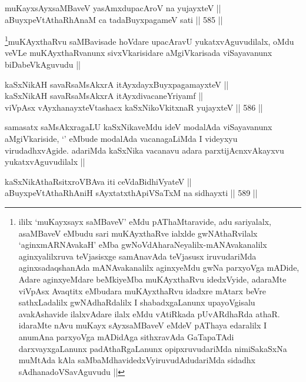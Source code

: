 \begin{shl}
muKayxsAyxsaMBaveV yasAmxdupacAroV na yujayxteV || \\
aBuyxpeVtAthaRhAnaM ca tadaBuyxpagameV sati ||  585 ||  
\end{shl}

\begin{artha}
\footnote{ililx `muKayxsayx saMBaveV' eMdu pAThaMtaravide, adu sariyalalx, asaMBaveV eMbudu sari muKAyxthaRve ialxlde gwNAthaRvilalx `aginxmARNAvakaH' eMba gwNoVdAharaNeyalilx-mANAvakanalilx aginxyalilxruva teVjasisxge samAnavAda teVjasusx iruvudariMda aginxsadaqshanAda mANAvakanalilx aginxyeMdu gwNa parxyoVga mADide, Adare aginxyeMdare beMkiyeMba muKAyxthaRvu idedxVyide, adaraMte viVpAsx Avaqtitx eMbudara muKAyxthaRvu idadxre mAtarx beVre sathxLadalilx gwNAdhaRdalilx I shabadxgaLanunx upayoVgisalu avakAshavide ilalxvAdare ilalx eMdu vAtiRkada pUvARdhaRda athaR. idaraMte nAvu muKayx sAyxsaMBaveV eMdeV pAThaya edaralilx I anumAna parxyoVga mADidAga sithxravAda GaTapaTAdi darxvayxgaLanunx padAthaRgaLanunx opipxruvudariMda nimiSakaSxNa muMtAda kAla saMbaMdhavidedxVyiruvudAdudariMda sidadhx sAdhanadoVSavAguvudu ||}muKAyxthaRvu saMBavisade hoVdare upacAravU yukatxvAguvudilalx, oMdu veVLe muKAyxthaRvanunx sivxVkarisidare aMgiVkarisada viSayavanunx biDabeVkAguvudu ||
\end{artha}


\begin{shl}
kaSxNikAH  savaRsaMsAkxrA itAyxdayxBuyxpagamayxteV || \\
kaSxNikAH  savaRsaMsAkxrA itAyxdivacaneYriyamf || \\
viVpAsx vAyxhanayxteV\s tashacx kaSxNikoVkitxnaR yujayxteV ||  586 ||  
\end{shl}

\begin{artha}
samasatx saMsAkxragaLU kaSxNikaveMdu ideV modalAda viSayavanunx aMgiVkariside, `\stext' eMbude modalAda vacanagaLiMda I videyxyu virudadhxvAgide. adariMda kaSxNika vacanavu adara parxtijAcnxvAkayxvu yukatxvAguvudilalx ||
\end{artha}


\begin{shl}
kaSxNikAthaRsitxroVBAva iti ceVdaBidhiVyateV || \\
aBuyxpeVtAthaRhAniH sAyxtatxthA\s piVSaTxM na sidhayxti ||  589 ||  
\end{shl}

